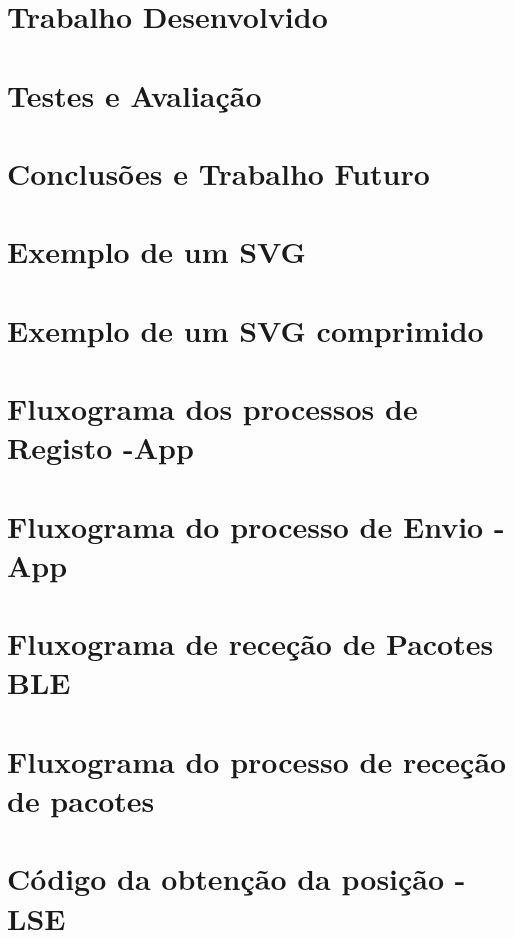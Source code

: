 \documentclass[a4paper, twoside, 12pt]{report}
\makeatletter
\renewcommand*{\cleardoublepage}{\clearpage\if@twoside \ifodd\c@page\else
\hbox{}%
\thispagestyle{empty}%
\newpage%
\if@twocolumn\hbox{}\newpage\fi\fi\fi}
\makeatother
\begin{document}
\chapter{Trabalho Desenvolvido}\label{workcharp}


\chapter{Testes e Avaliação}\label{cap4}


\chapter{Conclusões e Trabalho Futuro}








\renewcommand{\thesection}{Apêndices \Roman{section}}

\begin{appendices}
\chapter{Exemplo de um SVG} \label{svg}

 \chapter{Exemplo de um SVG comprimido} \label{svggo}

\chapter{Fluxograma dos processos de Registo -App}\label{E}


\chapter{Fluxograma do processo de Envio - App}\label{F}


\chapter{Fluxograma de receção de Pacotes BLE}\label{G}


 \chapter{Fluxograma do processo de receção de pacotes} \label{flux1}

\chapter{Código da obtenção da posição - LSE}\label{D}



\end{appendices}
\end{document}

